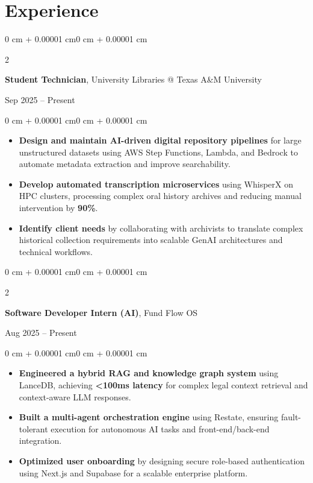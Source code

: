 \documentclass[letterpaper]{article}
\newenvironment{highlights}{
    \begin{itemize}[
        topsep=0pt,
        parsep=0.02 cm,
        partopsep=0pt,
        itemsep=2pt,
        leftmargin=10pt
    ]
}{
    \end{itemize}
}
\newenvironment{onecolentry}{
    \begin{adjustwidth}{0 cm + 0.00001 cm}{0 cm + 0.00001 cm}
}{
    \end{adjustwidth}
}
\newenvironment{twocolentry}[2][]{
    \onecolentry
    \def\secondColumn{#2}
    \setcolumnwidth{\fill, 4.5 cm}
    \begin{paracol}{2}
}{
    \switchcolumn \raggedleft \secondColumn
    \end{paracol} 
    \endonecolentry
}
\begin{document}
\section{Experience}

\begin{twocolentry}{Sep 2025 -- Present}
    \textbf{Student Technician}, University Libraries @ Texas A\&M University
\end{twocolentry}
\vspace{0.1cm}
\begin{onecolentry}
    \begin{highlights}
        \item \textbf{Design and maintain AI-driven digital repository pipelines} for large unstructured datasets using AWS Step Functions, Lambda, and Bedrock to automate metadata extraction and improve searchability.
        \item \textbf{Develop automated transcription microservices} using WhisperX on HPC clusters, processing complex oral history archives and reducing manual intervention by \textbf{90\%}.
        \item \textbf{Identify client needs} by collaborating with archivists to translate complex historical collection requirements into scalable GenAI architectures and technical workflows.
    \end{highlights}
\end{onecolentry}

\vspace{0.2cm}

\begin{twocolentry}{Aug 2025 -- Present}
    \textbf{Software Developer Intern (AI)}, Fund Flow OS
\end{twocolentry}
\vspace{0.1cm}
\begin{onecolentry}
    \begin{highlights}
        \item \textbf{Engineered a hybrid RAG and knowledge graph system} using LanceDB, achieving \textbf{<100ms latency} for complex legal context retrieval and context-aware LLM responses.
        \item \textbf{Built a multi-agent orchestration engine} using Restate, ensuring fault-tolerant execution for autonomous AI tasks and front-end/back-end integration.
        \item \textbf{Optimized user onboarding} by designing secure role-based authentication using Next.js and Supabase for a scalable enterprise platform.
    \end{highlights}
\end{onecolentry}
\end{document}
